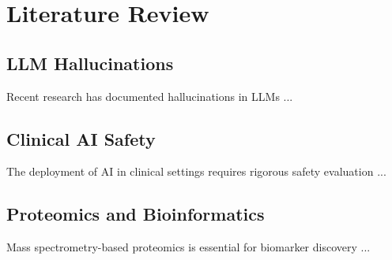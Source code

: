 \section{Literature Review}

\subsection{LLM Hallucinations}
Recent research has documented hallucinations in LLMs \cite{ji2023survey}...

\subsection{Clinical AI Safety}
The deployment of AI in clinical settings requires rigorous safety evaluation \cite{topol2019high}...

\subsection{Proteomics and Bioinformatics}
Mass spectrometry-based proteomics is essential for biomarker discovery \cite{aebersold2003mass}...
